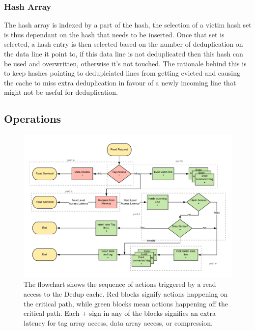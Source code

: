 \subsubsection{Hash Array}
\label{ref:DedupHashRepl}
The hash array is indexed by a part of the hash, the selection of a victim hash set is thus dependant on the hash that needs to be inserted. Once that set is selected, a hash entry is then selected based on the number of deduplication on the data line it point to, if this data line is not deduplicated then this hash can be used and overwritten, otherwise it's not touched. The rationale behind this is to keep hashes pointing to deduplciated lines from getting evicted and causing the cache to miss extra deduplication in favour of a newly incoming line that might not be useful for deduplication.\par

\subsection{Operations}
\label{ssec:DedupOperations}
\begin{figure}[h]
    \includegraphics[width=\textwidth]{Dedup_Read.pdf}
    \caption[Dedup Read]{The flowchart shows the sequence of actions triggered by a read access to the Dedup cache. Red blocks signify actions happening on the critical path, while green blocks mean actions happening off the critical path. Each + sign in any of the blocks signifies an extra latency for tag array access, data array access, or compression.}
    \label{fig:Dedup_Read}
\end{figure}
